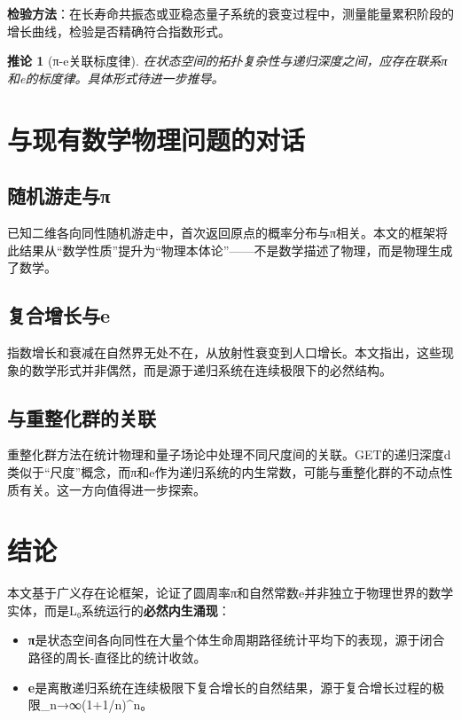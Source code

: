 \documentclass[12pt, a4paper]{article}
\newtheorem{corollary}{推论}[section]
\begin{document}
\textbf{检验方法}：在长寿命共振态或亚稳态量子系统的衰变过程中，测量能量累积阶段的增长曲线，检验是否精确符合指数形式。

\begin{corollary}[π-e关联标度律]
在状态空间的拓扑复杂性与递归深度之间，应存在联系π和e的标度律。具体形式待进一步推导。
\end{corollary}

\section{与现有数学物理问题的对话}

\subsection{随机游走与π}

已知二维各向同性随机游走中，首次返回原点的概率分布与π相关\cite{spitzer1976}。本文的框架将此结果从“数学性质”提升为“物理本体论”——不是数学描述了物理，而是物理生成了数学。

\subsection{复合增长与e}

指数增长和衰减在自然界无处不在，从放射性衰变到人口增长。本文指出，这些现象的数学形式并非偶然，而是源于递归系统在连续极限下的必然结构。

\subsection{与重整化群的关联}

重整化群方法在统计物理和量子场论中处理不同尺度间的关联\cite{wilson1975}。GET的递归深度d类似于“尺度”概念，而π和e作为递归系统的内生常数，可能与重整化群的不动点性质有关。这一方向值得进一步探索。

\section{结论}

本文基于广义存在论框架，论证了圆周率π和自然常数e并非独立于物理世界的数学实体，而是L₀系统运行的\textbf{必然内生涌现}：

\begin{itemize}
\item \textbf{π}是状态空间各向同性在大量个体生命周期路径统计平均下的表现，源于闭合路径的周长-直径比的统计收敛。
\item \textbf{e}是离散递归系统在连续极限下复合增长的自然结果，源于复合增长过程的极限\lim_{n→∞}(1+1/n)^n。
\end{itemize}
\end{document}
